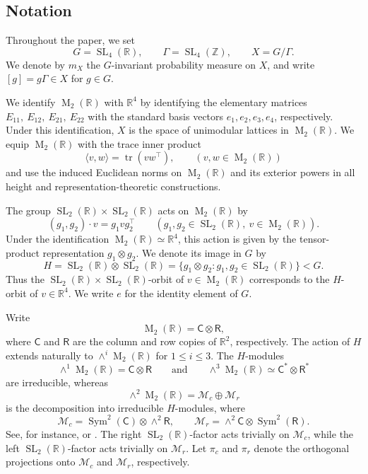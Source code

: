 \documentclass[reqno,11pt]{amsart}
\theoremstyle{definition}
\theoremstyle{remark}
\numberwithin{equation}{section}
\newcommand{\M}{\operatorname{M}}
\newcommand{\SL}{\operatorname{SL}}
\begin{document}
\subsection*{Notation}

Throughout the paper, we set
\begin{equation}\label{gg}
G=\SL_4(\mathbb R),\qquad
\Gamma=\SL_4(\mathbb Z),\qquad
X=G/\Gamma.
\end{equation}
We denote by $m_X$ the $G$-invariant probability measure on $X$, and
write $[g]=g\Gamma\in X$ for $g\in G$.

We identify $\M_2(\mathbb R)$ with $\mathbb R^4$ by identifying the
elementary matrices
$
E_{11},\ E_{12},\ E_{21},\ E_{22}
$
with the standard basis vectors $e_1,e_2,e_3,e_4$, respectively. Under
this identification, $X$ is the space of unimodular lattices in
$\M_2(\mathbb R)$. We equip $\M_2(\mathbb R)$ with the trace inner
product
$$
\langle v,w\rangle=\operatorname{tr}(vw^{\intercal}),\qquad(v, w\in \M_2(\mathbb R))
$$
and use the induced Euclidean norms on $\M_2(\mathbb R)$ and its exterior
powers in all height and representation-theoretic constructions. 

The group $\SL_2(\mathbb R)\times\SL_2(\mathbb R)$ acts on
$\M_2(\mathbb R)$ by
\begin{equation}\label{gh}
(g_1,g_2)\cdot v=g_1vg_2^{\intercal}
\qquad
(g_1,g_2\in\SL_2(\mathbb R),\ v\in\M_2(\mathbb R)).
\end{equation}
Under the identification $\M_2(\mathbb R)\simeq\mathbb R^4$, this action
is given by the tensor-product representation $g_1\otimes g_2$. We denote
its image in $G$ by
$$
H
=
\SL_2(\mathbb R)\otimes\SL_2(\mathbb R)
=
\{g_1\otimes g_2:g_1,g_2\in\SL_2(\mathbb R)\}
<G.
$$
Thus the $\SL_2(\mathbb R)\times\SL_2(\mathbb R)$-orbit of
$v\in\M_2(\mathbb R)$ corresponds to the $H$-orbit of $v\in\mathbb R^4$.
We write $e$ for the identity element of $G$.

Write
$$
\M_2(\mathbb R)=\mathsf C\otimes\mathsf R,
$$
where $\mathsf C$ and $\mathsf R$ are the column and row copies of
$\mathbb R^2$, respectively. The action of $H$ extends naturally to
$\wedge^i\M_2(\mathbb R)$ for $1\le i\le3$. The $H$-modules
$$
\wedge^1\M_2(\mathbb R)=\mathsf C\otimes\mathsf R
\qquad\text{and}\qquad
\wedge^3\M_2(\mathbb R)\simeq\mathsf C^*\otimes\mathsf R^*
$$
are irreducible, whereas
\begin{equation}\label{decom}
\wedge^2\M_2(\mathbb R)
=
\mathcal M_c\oplus\mathcal M_r
\end{equation}
is the decomposition into irreducible $H$-modules, where
\begin{equation}\label{decom2}
\mathcal M_c
=
\operatorname{Sym}^2(\mathsf C)\otimes\wedge^2\mathsf R,
\qquad
\mathcal M_r
=
\wedge^2\mathsf C\otimes\operatorname{Sym}^2(\mathsf R).
\end{equation}
See, for instance, \cite[Section~4.2]{FultonHarris} or
\cite[Chapter~I]{FultonYoung}. The right $\SL_2(\mathbb R)$-factor acts
trivially on $\mathcal M_c$, while the left $\SL_2(\mathbb R)$-factor
acts trivially on $\mathcal M_r$. Let $\pi_c$ and $\pi_r$ denote the
orthogonal projections onto $\mathcal M_c$ and $\mathcal M_r$,
respectively.
\end{document}
